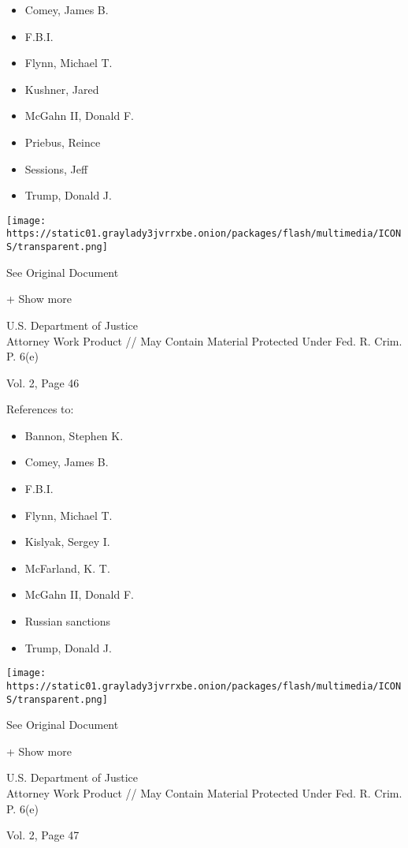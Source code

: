 \begin{itemize}
\tightlist
\item
  Comey, James B.
\item
  F.B.I.
\item
  Flynn, Michael T.
\item
  Kushner, Jared
\item
  McGahn II, Donald F.
\item
  Priebus, Reince
\item
  Sessions, Jeff
\item
  Trump, Donald J.
\end{itemize}

\protect\hyperlink{}{}

\texttt{[image: https://static01.graylady3jvrrxbe.onion/packages/flash/multimedia/ICONS/transparent.png]}

See Original Document

+ Show more

U.S. Department of Justice\\
Attorney Work Product // May Contain Material Protected Under Fed. R.
Crim. P. 6(e)

Vol. 2, Page 46

References to:

\begin{itemize}
\tightlist
\item
  Bannon, Stephen K.
\item
  Comey, James B.
\item
  F.B.I.
\item
  Flynn, Michael T.
\item
  Kislyak, Sergey I.
\item
  McFarland, K. T.
\item
  McGahn II, Donald F.
\item
  Russian sanctions
\item
  Trump, Donald J.
\end{itemize}

\protect\hyperlink{}{}

\texttt{[image: https://static01.graylady3jvrrxbe.onion/packages/flash/multimedia/ICONS/transparent.png]}

See Original Document

+ Show more

U.S. Department of Justice\\
Attorney Work Product // May Contain Material Protected Under Fed. R.
Crim. P. 6(e)

Vol. 2, Page 47

